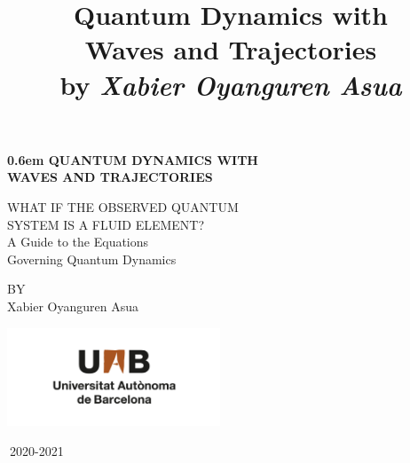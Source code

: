 \documentclass[11pt, a4paper]{article} %
\title{\vspace{-2cm} {\bf Quantum Dynamics  with\\ Waves and Trajectories}\\{\small by {\em Xabier Oyanguren Asua}}\vspace{-0.8cm}}
\date{\vspace{-11ex}}
\begin{document}
\clearpage
\newcommand\nbvspace[1][3]{\vspace*{\stretch{#1}}}
\newcommand\nbstretchyspace{\spaceskip0.5em plus 0.25em minus 0.25em}
\newcommand{\nbtitlestretch}{\spaceskip0.6em}
\pagestyle{empty}
\begin{center}
\bfseries
\nbvspace[1]
\Huge
{\nbtitlestretch\huge
QUANTUM DYNAMICS WITH \\ WAVES AND TRAJECTORIES}

\nbvspace[1]
\normalsize

WHAT IF THE OBSERVED QUANTUM\\
SYSTEM IS A FLUID ELEMENT?\\
\nbvspace[1]
A Guide to the Equations \\Governing Quantum Dynamics

\nbvspace[1]
\small BY\\
\Large Xabier Oyanguren Asua\\[0.5em]


\nbvspace[6]

\includegraphics[width=2.5in]{UAB.png}
\normalsize
\vspace{-0.5cm}

\large
\small
\small
$\ $2020-2021 
\nbvspace[1]
\end{center}
\newpage
\null
\clearpage

\maketitle
{}
\setlength{\cftbeforesecskip}{0.4cm}
\setlength{\cftbeforesubsecskip}{0.4cm}
\setlength{\cftbeforesubsubsecskip}{0.25cm}
\end{document}
